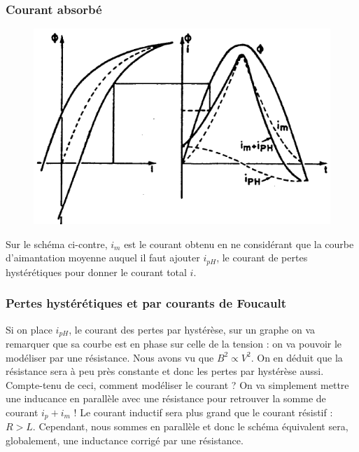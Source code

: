 		\subsubsection{Courant absorbé}
		\begin{figure}
		\includegraphics[scale=0.3]{ch3/image5.png}
		\end{figure}
		Sur le schéma ci-contre, $i_m$ 
		est le courant obtenu en ne considérant que la courbe d'aimantation 
		moyenne auquel il faut ajouter $i_{pH}$, le courant de pertes 
		hystérétiques pour donner le courant total $i$.
		
		
		\subsubsection{Pertes hystérétiques et par courants de Foucault}
		Si on place $i_{pH}$, le courant des pertes par hystérèse, sur un graphe
		 on va remarquer que sa courbe est en phase sur celle de la tension : 
		 on va pouvoir le modéliser par une résistance. Nous avons vu que 
		 $B^2\propto V^2$. On en déduit que la résistance sera à peu près 
		 constante et donc les pertes par hystérèse aussi.		\\
		 
		Compte-tenu de ceci, comment modéliser le courant ? On va simplement 
		mettre une inducance en parallèle avec une résistance pour retrouver 
		la somme de courant $i_p+i_m$ ! Le courant inductif sera plus grand 
		que le courant résistif : $R > L$. Cependant, nous sommes en parallèle 
		et donc le schéma équivalent sera, globalement, une inductance corrigé 
		par une résistance.
		
